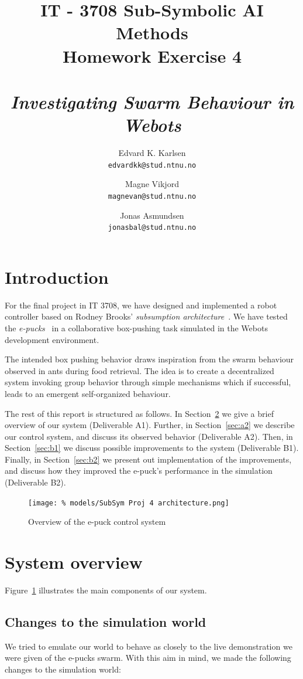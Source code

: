 \documentclass[a4paper,10pt]{article}
\title{
    IT - 3708 Sub-Symbolic AI Methods \\
    Homework Exercise 4\\
    ~\\
    \emph{Investigating Swarm Behaviour in Webots}
}
\author{
    Edvard K. Karlsen \\
    \texttt{edvardkk@stud.ntnu.no}
    \and
    Magne Vikjord \\
    \texttt{magnevan@stud.ntnu.no}
    \and
    Jonas Asmundsen \\
    \texttt{jonasbal@stud.ntnu.no}
}
\date {}
\begin{document}
\maketitle

\section{Introduction}
For the final project in IT 3708, we have designed and implemented a robot
controller based on Rodney Brooks' \emph{subsumption
architecture}~\cite{brooks1986}.  We have tested the
\emph{e-pucks}~\cite{bonani2009} in a collaborative box-pushing task simulated
in the Webots development environment.  

The intended box pushing behavior draws inspiration from the swarm behaviour
observed in ants during food retrieval.  The idea is to create a decentralized
system invoking group behavior through simple mechanisms which if successful,
leads to an emergent self-organized behaviour.

The rest of this report is structured as follows. In Section~\ref{sec:a1} we
give a brief overview of our system (Deliverable A1).  Further, in
Section~\ref{sec:a2} we describe our control system, and discuss its observed
behavior (Deliverable A2). Then, in Section~\ref{sec:b1} we discuss possible
improvements to the system (Deliverable B1). Finally, in Section~\ref{sec:b2}
we present out implementation of the improvements, and discuss how they
improved the e-puck's performance in the simulation (Deliverable B2).

\begin{figure}[!h]
  \centering
  \texttt{[image: \%
    models/SubSym Proj 4 architecture.png]}
    \caption{Overview of the e-puck control system}
  \label{fig:architecture}
\end{figure}

\section{System overview}
\label{sec:a1}

Figure~\ref{fig:architecture} illustrates the main components of our system.

\subsection{Changes to the simulation world}
We tried to emulate our world to behave as closely to the live demonstration
we were given of the e-pucks swarm. With this aim in mind, we made the
following changes to the simulation world:
\end{document}
